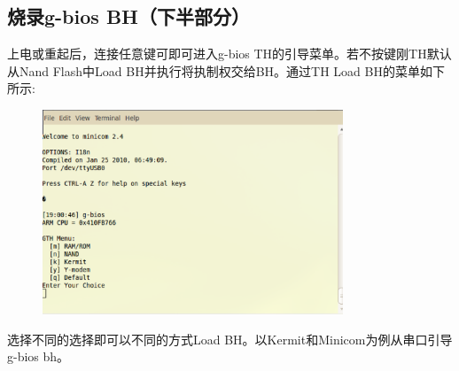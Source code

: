 \subsection{烧录g-bios BH（下半部分）}
上电或重起后，连接任意键可即可进入g-bios TH的引导菜单。若不按键刚TH默认从Nand Flash中Load BH并执行将执制权交给BH。通过TH Load BH的菜单如下所示:
\begin{figure}[H]
\centering
\includegraphics[width=0.8\textwidth]{image/min_01.eps}
\end{figure}
选择不同的选择即可以不同的方式Load BH。以Kermit和Minicom为例从串口引导g-bios bh。
